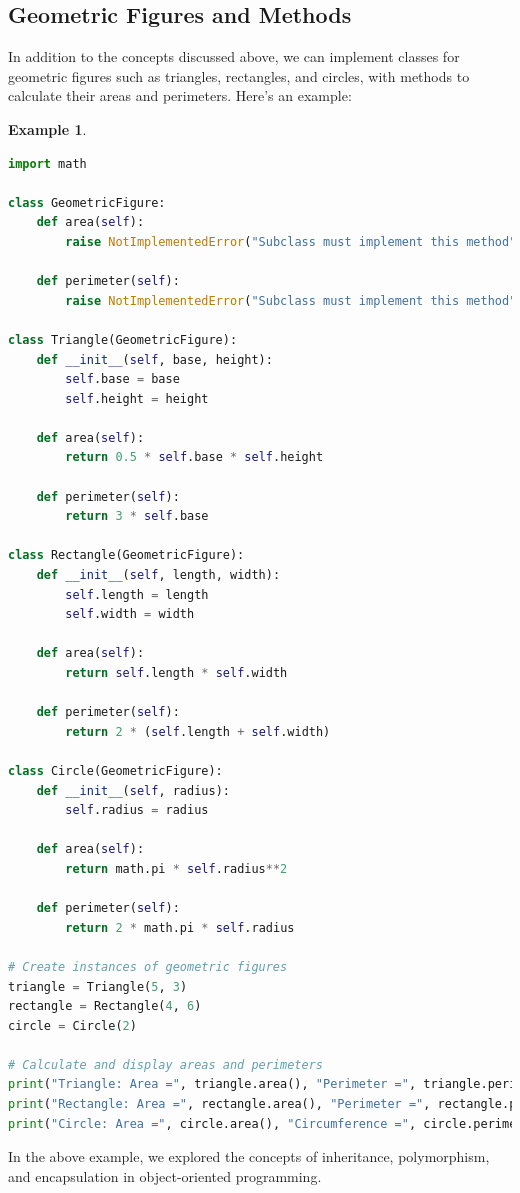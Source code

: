 \documentclass[12pt]{article}
\newtheorem{Example}{Example}[section]
\begin{document}
\subsection{Geometric Figures and Methods}

In addition to the concepts discussed above, we can implement classes for geometric figures such as triangles, rectangles, and circles, with methods to calculate their areas and perimeters. Here's an example:

\begin{Example}
\begin{lstlisting}[language=Python]
import math

class GeometricFigure:
    def area(self):
        raise NotImplementedError("Subclass must implement this method")

    def perimeter(self):
        raise NotImplementedError("Subclass must implement this method")

class Triangle(GeometricFigure):
    def __init__(self, base, height):
        self.base = base
        self.height = height

    def area(self):
        return 0.5 * self.base * self.height

    def perimeter(self):
        return 3 * self.base

class Rectangle(GeometricFigure):
    def __init__(self, length, width):
        self.length = length
        self.width = width

    def area(self):
        return self.length * self.width

    def perimeter(self):
        return 2 * (self.length + self.width)

class Circle(GeometricFigure):
    def __init__(self, radius):
        self.radius = radius

    def area(self):
        return math.pi * self.radius**2

    def perimeter(self):
        return 2 * math.pi * self.radius

# Create instances of geometric figures
triangle = Triangle(5, 3)
rectangle = Rectangle(4, 6)
circle = Circle(2)

# Calculate and display areas and perimeters
print("Triangle: Area =", triangle.area(), "Perimeter =", triangle.perimeter())
print("Rectangle: Area =", rectangle.area(), "Perimeter =", rectangle.perimeter())
print("Circle: Area =", circle.area(), "Circumference =", circle.perimeter())
\end{lstlisting}

\end{Example}
In the above example, we explored the concepts of inheritance, polymorphism, and encapsulation in object-oriented programming.
\end{document}
